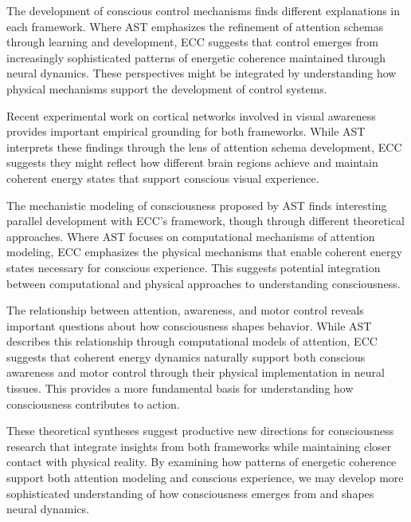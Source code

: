 The development of conscious control mechanisms \cite{Graziano2011} finds different explanations in each framework. Where AST emphasizes the refinement of attention schemas through learning and development, ECC suggests that control emerges from increasingly sophisticated patterns of energetic coherence maintained through neural dynamics. These perspectives might be integrated by understanding how physical mechanisms support the development of control systems.

Recent experimental work on cortical networks involved in visual awareness \cite{Webb2016} provides important empirical grounding for both frameworks. While AST interprets these findings through the lens of attention schema development, ECC suggests they might reflect how different brain regions achieve and maintain coherent energy states that support conscious visual experience.

The mechanistic modeling of consciousness proposed by AST \cite{Kelly2016} finds interesting parallel development with ECC's framework, though through different theoretical approaches. Where AST focuses on computational mechanisms of attention modeling, ECC emphasizes the physical mechanisms that enable coherent energy states necessary for conscious experience. This suggests potential integration between computational and physical approaches to understanding consciousness.

The relationship between attention, awareness, and motor control \cite{Graziano2002} reveals important questions about how consciousness shapes behavior. While AST describes this relationship through computational models of attention, ECC suggests that coherent energy dynamics naturally support both conscious awareness and motor control through their physical implementation in neural tissues. This provides a more fundamental basis for understanding how consciousness contributes to action.

These theoretical syntheses suggest productive new directions for consciousness research that integrate insights from both frameworks while maintaining closer contact with physical reality. By examining how patterns of energetic coherence support both attention modeling and conscious experience, we may develop more sophisticated understanding of how consciousness emerges from and shapes neural dynamics.